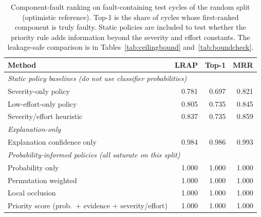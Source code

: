\begin{table}[t]
\centering
\caption{Component-fault ranking on fault-containing test cycles of the random split (optimistic reference). Top-1 is the share of cycles whose first-ranked component is truly faulty. Static policies are included to test whether the priority rule adds information beyond the severity and effort constants. The leakage-safe comparison is in Tables~\ref{tab:ceilingbound} and~\ref{tab:boundcheck}.}
\label{tab:ranking}
\footnotesize
\begin{tabularx}{\textwidth}{Xrrr}
\toprule
Method & LRAP & Top-1 & MRR \\
\midrule
\multicolumn{4}{l}{\emph{Static policy baselines (do not use classifier probabilities)}} \\
Severity-only policy & 0.781 & 0.697 & 0.821 \\
Low-effort-only policy & 0.805 & 0.735 & 0.845 \\
Severity/effort heuristic & 0.837 & 0.735 & 0.859 \\
\midrule
\multicolumn{4}{l}{\emph{Explanation-only}} \\
Explanation confidence only & 0.984 & 0.986 & 0.993 \\
\midrule
\multicolumn{4}{l}{\emph{Probability-informed policies (all saturate on this split)}} \\
Probability only & 1.000 & 1.000 & 1.000 \\
Permutation weighted & 1.000 & 1.000 & 1.000 \\
Local occlusion & 1.000 & 1.000 & 1.000 \\
Priority score (prob.\ $+$ evidence $+$ severity/effort) & 1.000 & 1.000 & 1.000 \\
\bottomrule
\end{tabularx}
\end{table}
